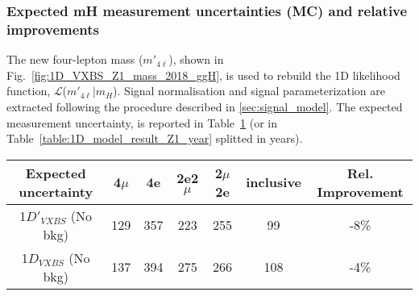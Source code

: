 \subsubsection{Expected mH measurement uncertainties (MC) and relative improvements}
The new four-lepton mass ($m'_{4\ell}$), shown in Fig.~\ref{fig:1D_VXBS_Z1_mass_2018_ggH},
is used to rebuild the 1D likelihood function, $\mathcal{L}$($m'_{4\ell}|m_{H}$). Signal normalisation and signal parameterization are extracted following the procedure described in \ref{sec:signal_model}.
The expected \mH measurement uncertainty, is reported in Table~\ref{table:1D_model_result_Z1} (or in Table~\ref{table:1D_model_result_Z1_year}
splitted in years).
\begin{table}[ht]	
\begin{center}
    \begin{tabular}{ccccccc}
        \hline			
    Expected uncertainty	&	4$\mu$	&	4e	&	2e2$\mu$	&2$\mu$2e	& inclusive & Rel. Improvement \\
        \hline			
        1$D'_{VXBS}$ (No bkg)	&	129	&	357	&	223	&	255	&	99	&	-8\%	\\
        1$D_{VXBS}$  (No bkg)	&	137	&	394	&	275	&	266	&	108 &	-4\%	\\
        \hline
\end{tabular}
\label{table:1D_model_result_Z1}
\end{center}
\end{table}
